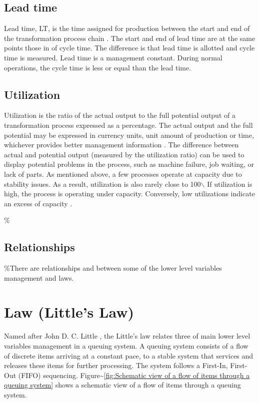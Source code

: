 \documentclass{article}
\begin{document}
\subsection{Lead time}

Lead time, LT, is the time assigned for production between the start and end of the transformation process chain \citep{Hopp2001}.
The start and end of lead time are at the same points those in of cycle time.
The difference is that lead time is allotted and cycle time is measured.
Lead time is a management constant.
During normal operations, the cycle time is less or equal than the lead time.

\subsection{Utilization}

Utilization is the ratio of the actual output to the full potential output of a transformation process expressed as a percentage.
The actual output and the full potential may be expressed in currency units, unit amount of production or time, whichever provides better management information \citep[pp.57-58]{Kumar2009}.
The difference between actual and potential output (measured by the utilization ratio) can be used to display potential problems in the process, such as machine failure, job waiting, or lack of parts.
As mentioned above, a few processes operate at capacity due to stability issues.
As a result, utilization is also rarely close to 100$\backslash$%
If utilization is high, the process is operating under capacity.
Conversely, low utilizations indicate an excess of capacity \citep{Hopp2001}.

\%\subsection{Relationships}

\%There are relationships and between some of the lower level variables management and laws.

\section{Law (Little's Law)}

Named after John D. C. Little \citep{Little1961}, the Little's law relates three of main lower level variables management in a queuing system.
A queuing system consists of a flow of discrete items arriving at a constant pace, to a stable system that services and releases these items for further processing.
The system follows a First-In, First-Out (FIFO) sequencing.
Figure\textasciitilde{}\ref{fig:Schematic view of a flow of items through a queuing system} shows a schematic view of a flow of items through a queuing system.
\end{document}
